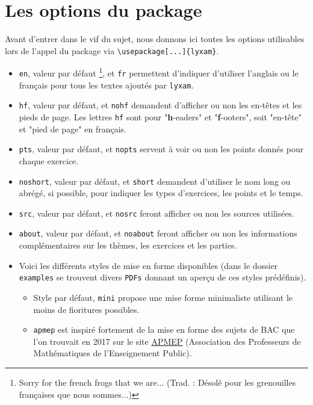 \documentclass[12pt,a4paper]{scrartcl}
\begin{document}
\section{Les options du package}

Avant d'entrer dans le vif du sujet, nous donnons ici toutes les options utilisables lors de l'appel du package via \verb+\usepackage[...]{lyxam}+.

\begin{itemize}
	\item \verb+en+, valeur par défaut
	\footnote{
		Sorry for the french frogs that we are... (Trad. : Désolé pour les grenouilles françaises que nous sommes...)
	}, et \verb+fr+ permettent d'indiquer d'utiliser l'anglais ou le français pour tous les textes ajoutés par \verb+lyxam+.

	\item \verb+hf+, valeur par défaut, et \verb+nohf+ demandent d'afficher ou non les en-têtes et les pieds de page.
	Les lettres \verb+hf+ sont pour "\textbf{h}-eaders" et "\textbf{f}-ooters", soit "en-tête" et "pied de page" en français.

	\item \verb+pts+, valeur par défaut, et \verb+nopts+ servent à voir ou non les points donnés pour chaque exercice.

	\item \verb+noshort+, valeur par défaut, et \verb+short+ demandent d'utiliser le nom long ou abrégé, si possible, pour indiquer les types d'exercices, les points et le temps.

	\item \verb+src+, valeur par défaut, et \verb+nosrc+ feront afficher ou non les sources utilisées.

	\item \verb+about+, valeur par défaut, et \verb+noabout+ feront afficher ou non les informations complémentaires sur les thèmes, les exercices et les parties.

	\item Voici les différents styles de mise en forme disponibles (dans le dossier \verb+examples+ se trouvent divers \verb+PDFs+ donnant un aperçu de ces styles prédéfinis).
	\begin{itemize}[label={\small\textbullet}]
        \item Style par défaut, \verb+mini+ propose une mise forme minimaliste utilisant le moins de fioritures possibles.
        
        \item \verb+apmep+ est inspiré fortement de la mise en forme des sujets de BAC que l'on trouvait en 2017 sur le site \href{https://www.apmep.fr}{APMEP} (Association des Professeurs de Mathématiques de l'Enseignement Public).
        

\end{itemize}
\end{itemize}
\end{document}
